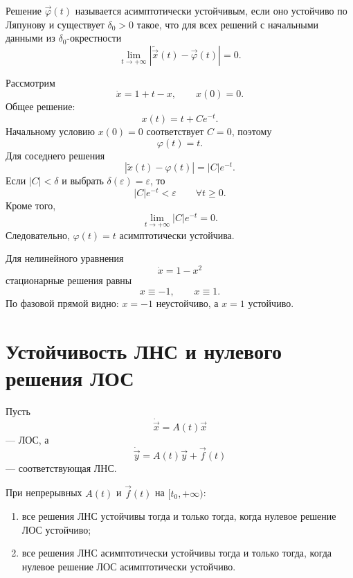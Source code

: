 \documentclass[12pt,a4paper]{article}
\numberwithin{equation}{section}
\newcommand{\vect}[1]{\vec{#1}}
\DeclareRobustCommand{\examtag}[1]{\space{\normalfont\small\color{HSEgray}(#1)}}
\begin{document}
\begin{definitionHSE}
Решение $\vect{\varphi}(t)$ называется асимптотически устойчивым, если оно устойчиво по Ляпунову и существует $\delta_0>0$ такое, что для всех решений с начальными данными из $\delta_0$-окрестности
\[
\lim_{t\to+\infty}
|\widetilde{\vect{x}}(t)-\vect{\varphi}(t)|=0.
\]
\end{definitionHSE}

\begin{exampleHSE}
Рассмотрим
\[
\dot x=1+t-x,
\qquad x(0)=0.
\]
Общее решение:
\[
x(t)=t+Ce^{-t}.
\]
Начальному условию $x(0)=0$ соответствует $C=0$, поэтому
\[
\varphi(t)=t.
\]
Для соседнего решения
\[
|\widetilde x(t)-\varphi(t)|=|C|e^{-t}.
\]
Если $|C|<\delta$ и выбрать $\delta(\varepsilon)=\varepsilon$, то
\[
|C|e^{-t}<\varepsilon
\qquad \forall t\ge0.
\]
Кроме того,
\[
\lim_{t\to+\infty}|C|e^{-t}=0.
\]
Следовательно, $\varphi(t)=t$ асимптотически устойчива.
\end{exampleHSE}

\begin{exampleHSE}
Для нелинейного уравнения
\[
\dot x=1-x^2
\]
стационарные решения равны
\[
x\equiv-1,
\qquad x\equiv1.
\]
По фазовой прямой видно: $x=-1$ неустойчиво, а $x=1$ устойчиво.

\end{exampleHSE}

\section[Устойчивость линейных систем\examtag{вопрос~28}]{Устойчивость ЛНС и нулевого решения ЛОС\examtag{вопрос~28}}

Пусть
\begin{equation}
\dot{\vect{x}}=A(t)\vect{x}
\label{eq:los-stab}
\end{equation}
--- ЛОС, а
\begin{equation}
\dot{\vect{y}}=A(t)\vect{y}+\vect{f}(t)
\label{eq:lns-stab}
\end{equation}
--- соответствующая ЛНС.

\begin{theoremHSE}
При непрерывных $A(t)$ и $\vect{f}(t)$ на $[t_0,+\infty)$:
\begin{enumerate}
  \item все решения ЛНС устойчивы тогда и только тогда, когда нулевое решение ЛОС устойчиво;
  \item все решения ЛНС асимптотически устойчивы тогда и только тогда, когда нулевое решение ЛОС асимптотически устойчиво.
\end{enumerate}
\end{theoremHSE}
\end{document}
